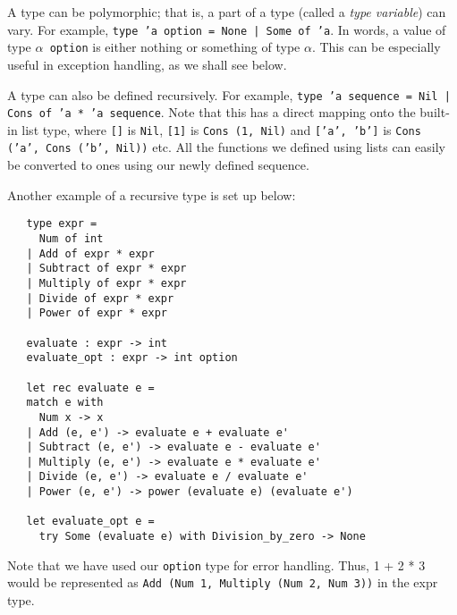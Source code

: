 \documentclass[12pt]{article}
\begin{document}
 A type can be polymorphic; that is, a part of a type (called a \textit{type variable}) can vary. For example,
 \texttt{type 'a option = None | Some of 'a}. In words, a value of type \texttt{$\alpha$ option} is either nothing or something
 of type $\alpha$. This can be especially useful in exception handling, as we shall see below.

 A type can also be defined recursively. For example, \texttt{type 'a sequence = Nil | Cons of 'a * 'a sequence}.
 Note that this has a direct mapping onto the built-in list type, where \texttt{[]} is \texttt{Nil}, \texttt{[1]} is \texttt{Cons (1, Nil)} and \texttt{['a', 'b']} is \texttt{Cons ('a', Cons ('b', Nil))}
 etc. All the functions we defined using lists can easily be converted to ones using our newly defined sequence.

 Another example of a recursive type is set up below:
 \begin{lstlisting}
   type expr =
     Num of int
   | Add of expr * expr
   | Subtract of expr * expr
   | Multiply of expr * expr
   | Divide of expr * expr
   | Power of expr * expr

   evaluate : expr -> int
   evaluate_opt : expr -> int option

   let rec evaluate e =
   match e with
     Num x -> x
   | Add (e, e') -> evaluate e + evaluate e'
   | Subtract (e, e') -> evaluate e - evaluate e'
   | Multiply (e, e') -> evaluate e * evaluate e'
   | Divide (e, e') -> evaluate e / evaluate e'
   | Power (e, e') -> power (evaluate e) (evaluate e')

   let evaluate_opt e =
     try Some (evaluate e) with Division_by_zero -> None
 \end{lstlisting}
 Note that we have used our \texttt{option} type for error handling. Thus, 1 + 2 * 3 would be represented as
 \texttt{Add (Num 1, Multiply (Num 2, Num 3))} in the expr type.
\end{document}
